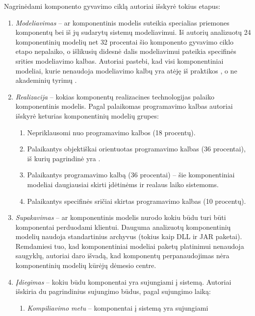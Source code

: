 Nagrinėdami komponento gyvavimo ciklą autoriai išskyrė tokius
etapus:
\begin{enumerate}
  \item \emph{Modeliavimas} – ar komponentinis modelis suteikia
    specialias priemones komponentų bei iš jų sudarytų sistemų
    modeliavimui. Iš autorių analizuotų 24 komponentinių modelių net
    32 procentai šio komponento gyvavimo ciklo etapo nepalaiko,
    o išlikusių didesnė dalis modeliavimui pateikia specifinės
    srities  modeliavimo kalbas. Autoriai
    pastebi, kad visi komponentiniai modeliai, kurie nenaudoja
    modeliavimo kalbų yra atėję iš praktikos , o ne akademinių tyrimų 
    \cite[604]{classification-framework-for-scm}.
  \item \emph{Realizacija} – kokias komponentų realizacines technologijas
    palaiko komponentinis modelis. Pagal palaikomas programavimo kalbas
    autoriai išskyrė keturias komponentinių modelių grupes:
    \begin{enumerate}
      \item Nepriklausomi nuo programavimo kalbos (18 procentų).
      \item Palaikantys objektiškai orientuotas programavimo kalbas
        (36 procentai), iš kurių pagrindinė yra .
      \item Palaikantys  programavimo kalbą (36 procentai)
        – šie komponentiniai modeliai daugiausiai skirti įdėtinėms
         ir realaus laiko sistemoms.
      \item Palaikantys specifinės sričiai  skirtas
        programavimo kalbas (10 procentų).
    \end{enumerate}
  \item \emph{Supakavimas} – ar komponentinis modelis nurodo kokiu
    būdu turi būti komponentai perduodami klientui. Dauguma
    analizuotų komponentinių modelių naudoja standartinius archyvus
    (tokius kaip DLL ir JAR paketai). Remdamiesi tuo, kad komponentiniai
    modeliai paketų platinimui nenaudoja saugyklų, autoriai daro
    išvadą, kad komponentų perpanaudojimas nėra komponentinių
    modelių kūrėjų dėmesio centre.
  \item \emph{Įdiegimas} – kokiu būdu komponentai yra sujungiami į sistemą.
    Autoriai išskiria du pagrindinius sujungimo būdus, pagal
    sujungimo laiką:
    \begin{enumerate}
      \item \emph{Kompiliavimo metu} – komponentai į sistemą yra sujungiami

\end{enumerate}
\end{enumerate}
